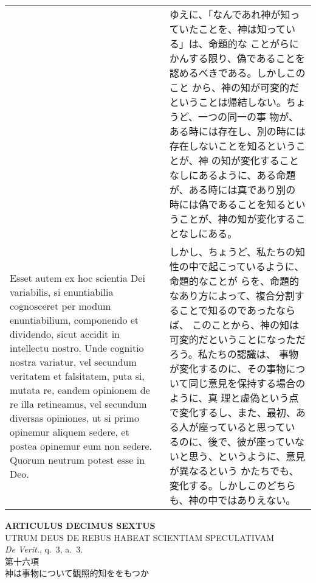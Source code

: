\documentclass[10pt]{jsarticle} %
\begin{document}
\begin{longtable}{p{21em}p{21em}}
&

ゆえに、「なんであれ神が知っていたことを、神は知っている」は、命題的な
ことがらにかんする限り、偽であることを認めるべきである。しかしこのこと
から、神の知が可変的だということは帰結しない。ちょうど、一つの同一の事
物が、ある時には存在し、別の時には存在しないことを知るということが、神
の知が変化することなしにあるように、ある命題が、ある時には真であり別の
時には偽であることを知るということが、神の知が変化することなしにある。

\\


Esset autem ex hoc scientia Dei variabilis, si
enuntiabilia cognosceret per modum enuntiabilium, componendo et
dividendo, sicut accidit in intellectu nostro. Unde cognitio nostra
variatur, vel secundum veritatem et falsitatem, puta si, mutata re,
eandem opinionem de re illa retineamus, vel secundum diversas opiniones,
ut si primo opinemur aliquem sedere, et postea opinemur eum non
sedere. Quorum neutrum potest esse in Deo.

&

しかし、ちょうど、私たちの知性の中で起こっているように、命題的なことが
らを、命題的なあり方によって、複合分割することで知るのであったならば、
このことから、神の知は可変的だということになっただろう。私たちの認識は、
事物が変化するのに、その事物について同じ意見を保持する場合のように、真
理と虚偽という点で変化するし、また、最初、ある人が座っていると思ってい
るのに、後で、彼が座っていないと思う、というように、意見が異なるという
かたちでも、変化する。しかしこのどちらも、神の中ではありえない。


\end{longtable}
\newpage




\begin{center}
 {\Large {\bf ARTICULUS DECIMUS SEXTUS}}\\
 {\large UTRUM DEUS DE REBUS HABEAT SCIENTIAM SPECULATIVAM}\\
 {\footnotesize {\itshape De Verit.}, q.~3, a.~3.}\\
 {\Large 第十六項\\神は事物について観照的知ををもつか}
\end{center}
\end{document}
